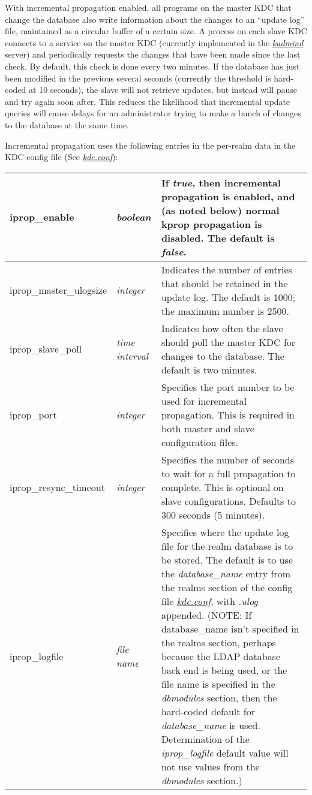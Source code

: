 \documentclass[letterpaper,10pt,english]{sphinxmanual}
\begin{document}
With incremental propagation enabled, all programs on the master KDC
that change the database also write information about the changes to
an ``update log'' file, maintained as a circular buffer of a certain
size.  A process on each slave KDC connects to a service on the master
KDC (currently implemented in the {\hyperref[admin/admin_commands/kadmind:kadmind-8]{\emph{kadmind}}} server) and
periodically requests the changes that have been made since the last
check.  By default, this check is done every two minutes.  If the
database has just been modified in the previous several seconds
(currently the threshold is hard-coded at 10 seconds), the slave will
not retrieve updates, but instead will pause and try again soon after.
This reduces the likelihood that incremental update queries will cause
delays for an administrator trying to make a bunch of changes to the
database at the same time.

Incremental propagation uses the following entries in the per-realm
data in the KDC config file (See {\hyperref[admin/conf_files/kdc_conf:kdc-conf-5]{\emph{kdc.conf}}}):

\begin{tabulary}{\linewidth}{|L|L|L|}
\hline

iprop\_enable
 & 
\emph{boolean}
 & 
If \emph{true}, then incremental propagation is enabled, and (as noted below) normal kprop propagation is disabled. The default is \emph{false}.
\\
\hline
iprop\_master\_ulogsize
 & 
\emph{integer}
 & 
Indicates the number of entries that should be retained in the update log. The default is 1000; the maximum number is 2500.
\\
\hline
iprop\_slave\_poll
 & 
\emph{time interval}
 & 
Indicates how often the slave should poll the master KDC for changes to the database. The default is two minutes.
\\
\hline
iprop\_port
 & 
\emph{integer}
 & 
Specifies the port number to be used for incremental propagation. This is required in both master and slave configuration files.
\\
\hline
iprop\_resync\_timeout
 & 
\emph{integer}
 & 
Specifies the number of seconds to wait for a full propagation to complete. This is optional on slave configurations.  Defaults to 300 seconds (5 minutes).
\\
\hline
iprop\_logfile
 & 
\emph{file name}
 & 
Specifies where the update log file for the realm database is to be stored. The default is to use the \emph{database\_name} entry from the realms section of the config file {\hyperref[admin/conf_files/kdc_conf:kdc-conf-5]{\emph{kdc.conf}}}, with \emph{.ulog} appended. (NOTE: If database\_name isn't specified in the realms section, perhaps because the LDAP database back end is being used, or the file name is specified in the \emph{dbmodules} section, then the hard-coded default for \emph{database\_name} is used. Determination of the \emph{iprop\_logfile}  default value will not use values from the \emph{dbmodules} section.)
\\
\hline\end{tabulary}
\end{document}
